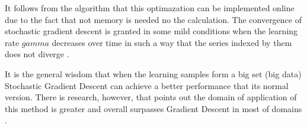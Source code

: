 \documentclass[11pt,a4paper]{article}
\begin{document}
It follows from the algorithm that this optimazation can be implemented online due to the fact that not memory is needed no the calculation. The convergence of stochastic gradient descent is granted in some mild conditions when the learning rate $gamma$ decreases over time in such a way that the series indexed by them does not diverge \citep{bottou2010large}. 

It is the general wisdom that when the learning samples form a big set (big data) Stochastic Gradient Descent can achieve a better performance that its normal version. There is research, however, that points out the domain of application of this method is greater and overall surpasses Gradient Descent in most of domains \citep{wilson2003general}. 



\end{document}
